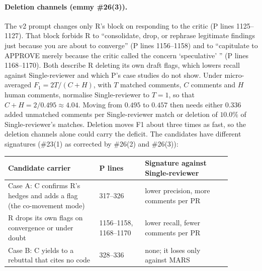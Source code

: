 \documentclass{article}
\begin{document}
\paragraph{Deletion channels (emmy \#26(3)).} The v2 prompt changes only
R's block on responding to the critic (P lines 1125--1127). That block
forbids R to ``consolidate, drop, or rephrase legitimate findings just
because you are about to converge'' (P lines 1156--1158) and to
``capitulate to APPROVE merely because the critic called the concern
`speculative' '' (P lines 1168--1170). Both describe R deleting its own
draft flags, which lowers recall against Single-reviewer and which P's
case studies do not show. Under micro-averaged $F_1=2T/(C+H)$, with $T$
matched comments, $C$ comments and $H$ human comments, normalise
Single-reviewer to $T=1$, so that $C+H=2/0.495\approx4.04$. Moving from
$0.495$ to $0.457$ then needs either $0.336$ added unmatched comments per
Single-reviewer match or deletion of $10.0\%$ of Single-reviewer's
matches. Deletion moves F1 about three times as fast, so the deletion
channels alone could carry the deficit. The candidates have different
signatures (\#23(1) as corrected by \#26(2) and \#26(3)):
\begin{center}\small
\begin{tabular}{p{0.36\linewidth}p{0.18\linewidth}p{0.34\linewidth}}
\hline
\raggedright Candidate carrier & \raggedright P lines &
\raggedright Signature against Single-reviewer\tabularnewline
\hline
\raggedright Case A: C confirms R's hedges and adds a flag (the
co-movement mode) & \raggedright 317--326 &
\raggedright lower precision, more comments per PR\tabularnewline
\raggedright R drops its own flags on convergence or under doubt &
\raggedright 1156--1158, 1168--1170 &
\raggedright lower recall, fewer comments per PR\tabularnewline
\raggedright Case B: C yields to a rebuttal that cites no code &
\raggedright 328--336 &
\raggedright none; it loses only against MARS\tabularnewline
\hline
\end{tabular}
\end{center}
\end{document}
